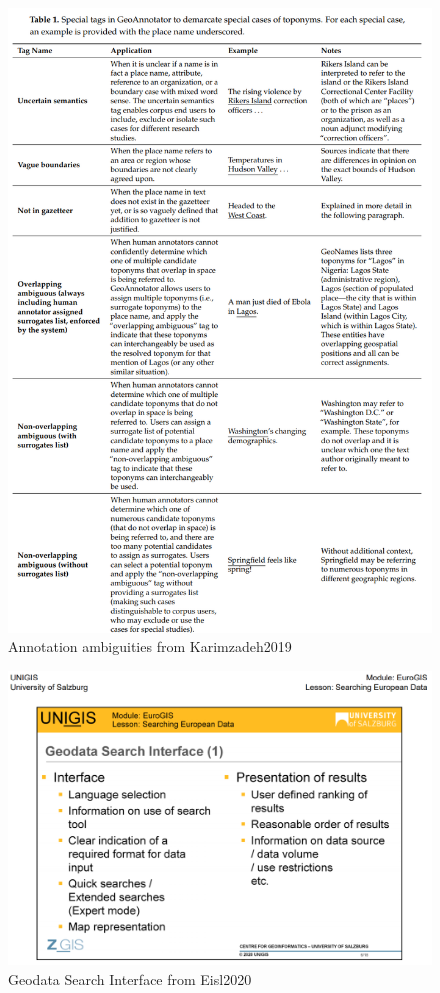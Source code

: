\begin{figure}[H]
	\centering
	\includegraphics[width=.9\linewidth]{images/karimzadeh2019_table1.png}
	\caption{Annotation ambiguities from Karimzadeh2019}%
	\label{fig:karimzadeh2019_t1}
\end{figure}

\begin{figure}[H]
	\centering
	\includegraphics[width=.9\linewidth]{images/unigis_geodatasearch.png}
	\caption{Geodata Search Interface from Eisl2020}%
	\label{fig:Eisl2020_f}
\end{figure}


